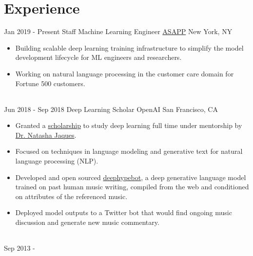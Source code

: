 \documentclass[letterpaper]{twentysecondcv} %
\begin{document}
\makeprofile %


\section{Experience}

\begin{twenty} %
    \twentyitem
    	{Jan 2019 -}
		{Present}
        {Staff Machine Learning Engineer}
        {\href{https://www.asapp.com/}{ASAPP}}
        {New York, NY}
        {
        {\begin{itemize} \itemsep 2pt %
        \item Building scalable deep learning training infrastructure to simplify the model development lifecycle for ML engineers and researchers.
        \item Working on natural language processing in the customer care domain for Fortune 500 customers.
        \end{itemize}}
        }
    \\
    \twentyitem
    	{Jun 2018 -}
		{Sep 2018}
        {Deep Learning Scholar}
        {OpenAI}
        {San Francisco, CA}
        {
        {\begin{itemize} \itemsep 2pt %
        \item Granted a \href{https://blog.openai.com/openai-scholars/}{scholarship} to study deep learning full time under mentorship by \href{https://natashajaques.ai/}{Dr. Natasha Jaques}.
        \item Focused on techniques in language modeling and generative text for natural language processing (NLP).
        \item Developed and open sourced \href{https://github.com/iconix/deephypebot}{deephypebot}, a deep generative language model trained on past human music writing, compiled from the web and conditioned on attributes of the referenced music.
        \item Deployed model outputs to a Twitter bot that would find ongoing music discussion and generate new music commentary.
        \end{itemize}}
        }
    \\
    \twentyitem
    	{Sep 2013 -}

\end{twenty}
\end{document}
